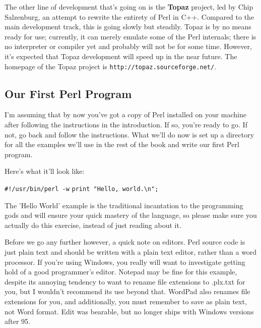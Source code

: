 \documentclass[a4paper,11pt]{book}
\begin{document}
\noindent 

\noindent The other line of development that's going on is the \textbf{Topaz }project, led by Chip Salzenburg, an attempt to rewrite the entirety of Perl in C++. Compared to the main development track, this is going slowly but steadily. Topaz is by no means ready for use; currently, it can merely emulate some of the Perl internals; there is no interpreter or compiler yet and probably will not be for some time. However, it's expected that Topaz development will speed up in the near future. The homepage of the Topaz project is \texttt{http://topaz.sourceforge.net/}.

\subsection{Our First Perl Program}

\noindent I'm assuming that by now you've got a copy of Perl installed on your machine after following the instructions in the introduction. If so, you're ready to go. If not, go back and follow the instructions. What we'll do now is set up a directory for all the examples we'll use in the rest of the book and write our first Perl program.

\noindent 

\noindent Here's what it'll look like:

\noindent 

\noindent \texttt{\#!/usr/bin/perl -w}
\noindent \texttt{print "Hello, world.\textbackslash n";}

\noindent 

\noindent The 'Hello World' example is the traditional incantation to the programming gods and will ensure your quick mastery of the language, so please make sure you actually do this exercise, instead of just reading about it.

\noindent 

\noindent Before we go any further however, a quick note on editors. Perl source code is just plain text and should be written with a plain text editor, rather than a word processor. If you're using Windows, you really will want to investigate getting hold of a good programmer's editor. Notepad may be fine for this example, despite its annoying tendency to want to rename file extensions to .plx.txt for you, but I wouldn't recommend its use beyond that. WordPad also renames file extensions for you, and additionally, you must remember to save as plain text, not Word format. Edit was bearable, but no longer ships with Windows versions after 95.
\end{document}
